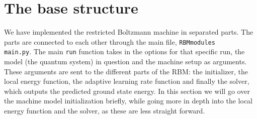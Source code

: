 \section{The base structure}

We have implemented the restricted Boltzmann machine in separated parts. The parts are connected to each other through the main file, \texttt{RBMmodules\\main.py}. The main \texttt{run} function takes in the options for that specific run, the model (the quantum system) in question and the machine setup as arguments. These arguments are sent to the different parts of the RBM: the initializer, the local energy function, the adaptive learning rate function and finally the solver, which outputs the predicted ground state energy. In this section we will go over the machine model initialization briefly, while going more in depth into the local energy function and the solver, as these are less straight forward.

